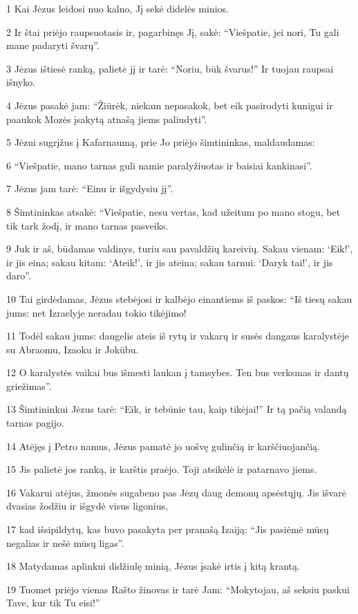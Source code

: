 \par 1 Kai Jėzus leidosi nuo kalno, Jį sekė didelės minios. 
\par 2 Ir štai priėjo raupsuotasis ir, pagarbinęs Jį, sakė: “Viešpatie, jei nori, Tu gali mane padaryti švarų”. 
\par 3 Jėzus ištiesė ranką, palietė jį ir tarė: “Noriu, būk švarus!” Ir tuojau raupsai išnyko. 
\par 4 Jėzus pasakė jam: “Žiūrėk, niekam nepasakok, bet eik pasirodyti kunigui ir paaukok Mozės įsakytą atnašą jiems paliudyti”. 
\par 5 Jėzui sugrįžus į Kafarnaumą, prie Jo priėjo šimtininkas, maldaudamas: 
\par 6 “Viešpatie, mano tarnas guli namie paralyžiuotas ir baisiai kankinasi”. 
\par 7 Jėzus jam tarė: “Einu ir išgydysiu jį”. 
\par 8 Šimtininkas atsakė: “Viešpatie, nesu vertas, kad užeitum po mano stogu, bet tik tark žodį, ir mano tarnas pasveiks. 
\par 9 Juk ir aš, būdamas valdinys, turiu sau pavaldžių kareivių. Sakau vienam: ‘Eik!’, ir jis eina; sakau kitam: ‘Ateik!’, ir jis ateina; sakau tarnui: ‘Daryk tai!’, ir jis daro”. 
\par 10 Tai girdėdamas, Jėzus stebėjosi ir kalbėjo einantiems iš paskos: “Iš tiesų sakau jums: net Izraelyje neradau tokio tikėjimo! 
\par 11 Todėl sakau jums: daugelis ateis iš rytų ir vakarų ir susės dangaus karalystėje su Abraomu, Izaoku ir Jokūbu. 
\par 12 O karalystės vaikai bus išmesti laukan į tamsybes. Ten bus verksmas ir dantų griežimas”. 
\par 13 Šimtininkui Jėzus tarė: “Eik, ir tebūnie tau, kaip tikėjai!” Ir tą pačią valandą tarnas pagijo. 
\par 14 Atėjęs į Petro namus, Jėzus pamatė jo uošvę gulinčią ir karščiuojančią. 
\par 15 Jis palietė jos ranką, ir karštis praėjo. Toji atsikėlė ir patarnavo jiems. 
\par 16 Vakarui atėjus, žmonės sugabeno pas Jėzų daug demonų apsėstųjų. Jis išvarė dvasias žodžiu ir išgydė visus ligonius, 
\par 17 kad išsipildytų, kas buvo pasakyta per pranašą Izaiją: “Jis pasiėmė mūsų negalias ir nešė mūsų ligas”. 
\par 18 Matydamas aplinkui didžiulę minią, Jėzus įsakė irtis į kitą krantą. 
\par 19 Tuomet priėjo vienas Rašto žinovas ir tarė Jam: “Mokytojau, aš seksiu paskui Tave, kur tik Tu eisi!” 
